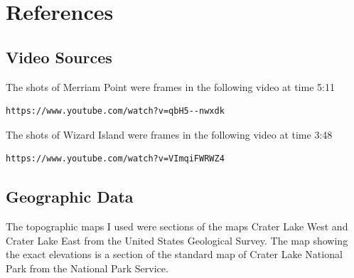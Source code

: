 \documentclass[11pt,psfig]{article}
\begin{document}
\newpage

\section{References}

\subsection{Video Sources}

The shots of Merriam Point were frames in the following video at time 5:11
\begin{verbatim}
https://www.youtube.com/watch?v=qbH5--nwxdk
\end{verbatim}
The shots of Wizard Island were frames in the following video at time 3:48
\begin{verbatim}
https://www.youtube.com/watch?v=VImqiFWRWZ4
\end{verbatim}

\subsection{Geographic Data}

The topographic maps I used were sections of the maps Crater Lake West and Crater Lake East from the United States Geological Survey. The map showing the exact elevations is a section of the standard map of Crater Lake National Park from the National Park Service. 
\end{document}
